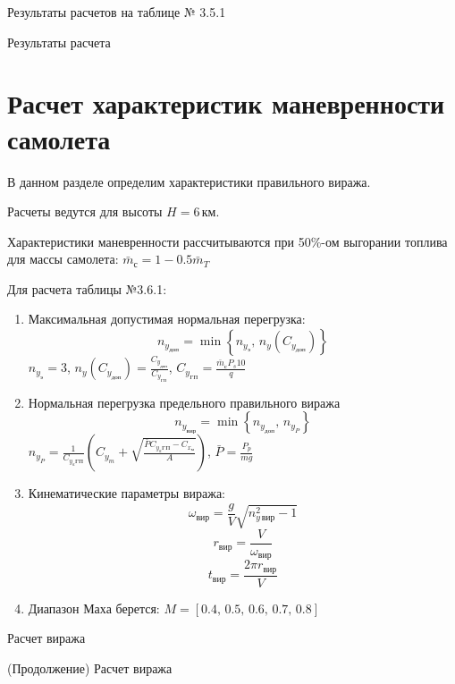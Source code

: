 Результаты расчетов на таблице № 3.5.1

\begin{table}[H]
    \centering
    \caption{Результаты расчета}
    \label{tab:landing_takeoff}
    
\end{table}

\section{Расчет характеристик маневренности самолета}

В данном разделе определим характеристики правильного виража.

Расчеты ведутся для высоты $H=6\, \text{км}$.

Характеристики маневренности рассчитываются при 50\%-ом выгорании
топлива для массы самолета: $\bar{m}_с = 1 - 0.5 \bar{m}_T$

Для расчета таблицы №3.6.1:
\begin{enumerate}
    \item Максимальная допустимая нормальная перегрузка:
        \[
            n_{y_{доп}}=\min \left\{ n_{y_{э}},\,n_y(C_{y_{доп}}) \right\} 
        \]
        $n_{y_{э}} = 3$, $n_y(C_{y_{доп}}) = \frac{C_{y_{доп}}}{C_{y_{ГП}}}$,
        $C_{y_{ГП}} = \frac{\bar{m}_с P_s 10}{q}$
    \item Нормальная перегрузка предельного правильного виража
        \[
            n_{y_{вир}}=\min \left\{ n_{y_{доп}},\,n_{y_P} \right\} 
        \]
        $n_{y_{P}} = \frac{1}{C_{y_{a}ГП}} \left( C_{y_m} + \sqrt{
        \frac{\bar{P} C_{y_{a}ГП} - C_{x_{м}} }{A}} \right) $, $\bar{P} = \frac{P_p}{mg}$
    \item Кинематические параметры виража:
        \[
            \omega_{вир}  = \frac{g}{V} \sqrt{n_{y\, вир}^2 - 1}
        \]
        \[
            r_{вир} = \frac{V}{\omega_{вир}}
        \]
        \[
            t_{вир} = \frac{2 \pi r_{вир}}{V}
        \]
        \item Диапазон Маха берется:
            $M = [0.4,\, 0.5,\, 0.6,\,0.7,\,0.8]$
\end{enumerate}

\begin{table}[H]
    \centering
    \caption{Расчет виража}
    \label{tab:turn_part1}
    
\end{table}
\begin{table}[H]
    \centering
    \caption{(Продолжение) Расчет виража}
    \label{tab:turn_part2}
    
\end{table}


